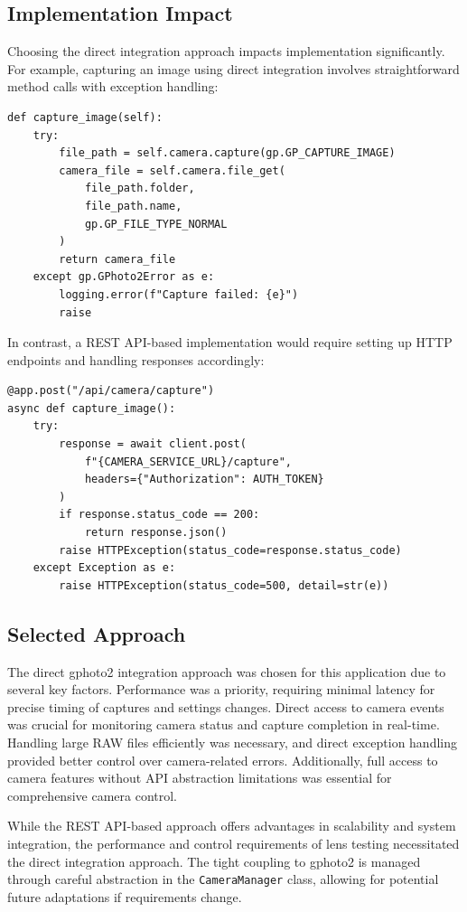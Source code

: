 \subsection{Implementation Impact}

Choosing the direct integration approach impacts implementation significantly. For example, capturing an image using direct integration involves straightforward method calls with exception handling:

\begin{verbatim}
def capture_image(self):
    try:
        file_path = self.camera.capture(gp.GP_CAPTURE_IMAGE)
        camera_file = self.camera.file_get(
            file_path.folder,
            file_path.name,
            gp.GP_FILE_TYPE_NORMAL
        )
        return camera_file
    except gp.GPhoto2Error as e:
        logging.error(f"Capture failed: {e}")
        raise
\end{verbatim}

In contrast, a REST API-based implementation would require setting up HTTP endpoints and handling responses accordingly:

\begin{verbatim}
@app.post("/api/camera/capture")
async def capture_image():
    try:
        response = await client.post(
            f"{CAMERA_SERVICE_URL}/capture",
            headers={"Authorization": AUTH_TOKEN}
        )
        if response.status_code == 200:
            return response.json()
        raise HTTPException(status_code=response.status_code)
    except Exception as e:
        raise HTTPException(status_code=500, detail=str(e))
\end{verbatim}

\subsection{Selected Approach}

The direct gphoto2 integration approach was chosen for this application due to several key factors. Performance was a priority, requiring minimal latency for precise timing of captures and settings changes. Direct access to camera events was crucial for monitoring camera status and capture completion in real-time. Handling large RAW files efficiently was necessary, and direct exception handling provided better control over camera-related errors. Additionally, full access to camera features without API abstraction limitations was essential for comprehensive camera control.

While the REST API-based approach offers advantages in scalability and system integration, the performance and control requirements of lens testing necessitated the direct integration approach. The tight coupling to gphoto2 is managed through careful abstraction in the \texttt{CameraManager} class, allowing for potential future adaptations if requirements change.

